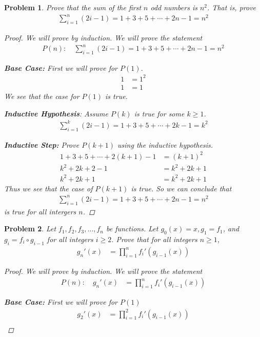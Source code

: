 \documentclass{article}
\theoremstyle{problemstyle}
\newtheorem{problem}{Problem}
\begin{document}
\begin{problem}
   
Prove that the sum of the first $n$ odd numbers is $n^2$. That is, prove
\begin{align*}
  \sum_{i=1}^{n}(2i-1) = 1 + 3 + 5 + \cdots + 2n-1 = n^2
\end{align*}

\begin{proof}
   We will prove by induction. We will prove the statement
   \begin{align*}
     P(n):\quad \sum_{i=1}^{n}(2i-1) = 1 + 3 + 5 + \cdots + 2n-1 = n^2
   \end{align*}

   \textbf{Base Case:} First we will prove for $P(1)$.
   \begin{align*}
     1 &= 1^2\\
     1 &= 1
   \end{align*}
   We see that the case for $P(1)$ is true.

   \textbf{Inductive Hypothesis}: Assume $P(k)$ is true for some $k\ge1$.
   \begin{align*}
     \sum_{i=1}^{k}(2i-1) = 1 + 3 + 5 + \cdots + 2k-1 = k^2
   \end{align*}

   \textbf{Inductive Step:} Prove $P(k+1)$ using the \textit{inductive
   hypothesis}.
   \begin{align*}
   1+3+5+\cdots+2(k+1)-1 &= {(k+1)}^2\\
   k^2 + 2k+2-1 &= k^2+2k+1\\
   k^2+2k+1 &= k^2+2k+1
   \end{align*}
   Thus we see that the case of $P(k+1)$ is true. So we can conclude that 
   \begin{align*}
     \sum_{i=1}^{n}(2i-1) = 1 + 3 + 5 + \cdots + 2n-1 = n^2
   \end{align*}
   is true for all intergers $n$.
\end{proof}
\end{problem}

\begin{problem}
  Let $f_1,f_2,f_3,\ldots,f_n$ be functions. Let $g_0(x)=x,g_1=f_1$, and
  $g_i=f_i\circ g_{i-1}$ for all integers $i \ge 2$. Prove that for all integers
  $n \ge 1$,
  \begin{align*}
    g_n'(x) &= \prod_{i=1}^{n}f_i'(g_{i-1}(x))
  \end{align*}
  \begin{proof}
     We will prove by induction. We will prove the statement
     \begin{align*}
       P(n):\quad g_n'(x) &= \prod_{i=1}^{n}f_i'(g_{i-1}(x))
     \end{align*}

     \textbf{Base Case:} First we will prove for $P(1)$
     \begin{align*}
       g_2'(x) &= \prod_{i=1}^{2}f_i'(g_{i-1}(x))\\
     \end{align*}
  \end{proof}
\end{problem}
\end{document}
